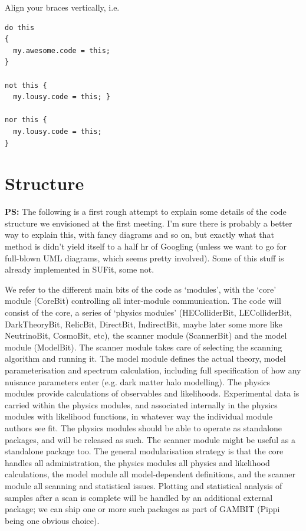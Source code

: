 Align your braces vertically, i.e. 
\begin{verbatim}
do this
{ 
  my.awesome.code = this;
}

not this {
  my.lousy.code = this; }

nor this {
  my.lousy.code = this; 
}
\end{verbatim}

\section{Structure}

\textbf{PS:} The following is a first rough attempt to explain some details of the code structure we envisioned at the first meeting.  I'm sure there is probably a better way to explain this, with fancy diagrams and so on, but exactly what that method is didn't yield itself to a half hr of Googling (unless we want to go for full-blown UML diagrams, which seems pretty involved).  Some of this stuff is already implemented in SUFit, some not.

We refer to the different main bits of the code as `modules', with the `core' module (CoreBit) controlling all inter-module communication.  The code will consist of the core, a series of `physics modules' (HEColliderBit, LEColliderBit, DarkTheoryBit, RelicBit, DirectBit, IndirectBit, maybe later some more like NeutrinoBit, CosmoBit, etc), the scanner module (ScannerBit) and the model module (ModelBit).  The scanner module takes care of selecting the scanning algorithm and running it.  The model module defines the actual theory, model parameterisation and spectrum calculation, including full specification of how any nuisance parameters enter (e.g. dark matter halo modelling).  The physics modules provide calculations of observables and likelihoods.  Experimental data is carried within the physics modules, and associated internally in the physics modules with likelihood functions, in whatever way the individual module authors see fit.  The physics modules should be able to operate as standalone packages, and will be released as such.  The scanner module might be useful as a standalone package too.  The general modularisation strategy is that the core handles all administration, the physics modules all physics and likelihood calculations, the model module all model-dependent definitions, and the scanner module all scanning and statistical issues.  Plotting and statistical analysis of samples after a scan is complete will be handled by an additional external package; we can ship one or more such packages as part of GAMBIT (Pippi being one obvious choice).

